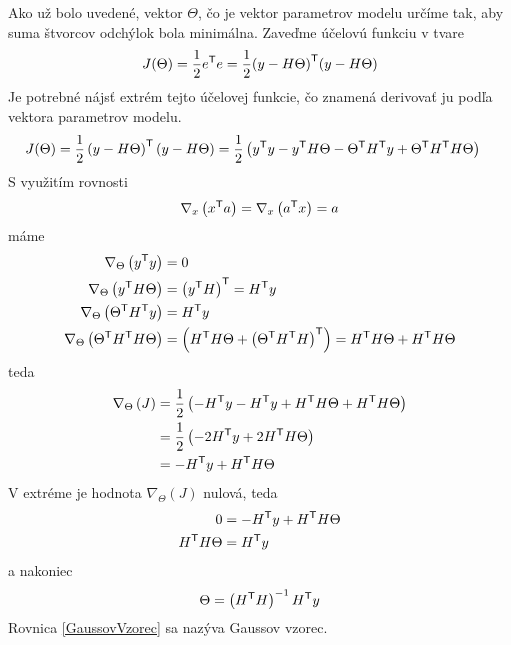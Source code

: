 \documentclass[a4paper, 10pt, ]{article}
\begin{document}
Ako už bolo uvedené, vektor $\Theta$, čo je vektor parametrov modelu určíme tak, aby suma štvorcov odchýlok bola minimálna. Zaveďme účelovú funkciu v tvare
\begin{equation} \label{ucFcnBez}
	J(\Theta) = \frac{1}{2}  e^{\mathsf{T}} e =  \frac{1}{2} {\left({ y -  H \Theta}\right)}^{\mathsf{T}} {\left({ y -  H \Theta}\right)}
\end{equation}
Je potrebné nájsť extrém tejto účelovej funkcie, čo znamená derivovať ju podľa vektora parametrov modelu.
\begin{equation}
	\begin{split}
	J(\Theta) &= \frac{1}{2} \left( y -  H \Theta \right)^{\mathsf{T}}   \left( y - H \Theta \right) = \frac{1}{2} \left( y^{\mathsf{T}} y - y^{\mathsf{T}} H \Theta - \Theta^{\mathsf{T}} H^{\mathsf{T}} y + \Theta^{\mathsf{T}} H^{\mathsf{T}} H \Theta \right)
\end{split}
\end{equation}
S využitím rovnosti
\begin{equation}
	\nabla_{x} \left( x^{\mathsf{T}} a \right) = \nabla_{x} \left( a^{\mathsf{T}} x \right) = a
\end{equation}
máme
\begin{align*}
	\nabla_\Theta \left( y^{\mathsf{T}} y \right) &= 0 \\
	\nabla_\Theta \left( y^{\mathsf{T}} H \Theta \right) &= \left( y^{\mathsf{T}} H \right)^{\mathsf{T}} = H^{\mathsf{T}} y \\
	\nabla_\Theta \left( \Theta^{\mathsf{T}} H^{\mathsf{T}} y \right) &= H^{\mathsf{T}} y \\
	\nabla_\Theta \left( \Theta^{\mathsf{T}} H^{\mathsf{T}} H \Theta \right) &= \left( H^{\mathsf{T}} H \Theta + \left( \Theta^{\mathsf{T}} H^{\mathsf{T}} H \right)^{\mathsf{T}} \right) = H^{\mathsf{T}} H \Theta + H^{\mathsf{T}} H \Theta
\end{align*}
teda
\begin{equation}
	\begin{split}
		\nabla_{\Theta} \left( J \right) &= \frac{1}{2} \left( - H^{\mathsf{T}} y - H^{\mathsf{T}} y + H^{\mathsf{T}} H \Theta + H^{\mathsf{T}} H \Theta \right)
		\\ & = \frac{1}{2} \left( - 2 H^{\mathsf{T}} y + 2 H^{\mathsf{T}} H \Theta \right)
		\\ & = - H^{\mathsf{T}} y + H^{\mathsf{T}}  H \Theta
	\end{split}
\end{equation}
V extréme je hodnota $\nabla_{\Theta} \left( J \right)$ nulová, teda
\begin{equation}
	\begin{split}
		0 &= - H^{\mathsf{T}} y + H^{\mathsf{T}} H \Theta \\
		H^{\mathsf{T}} H \Theta &= H^{\mathsf{T}} y
	\end{split}
\end{equation}
a nakoniec
\begin{equation} \label{GaussovVzorec}
	\Theta = \left( H^{\mathsf{T}} H \right)^{-1} H^{\mathsf{T}} y
\end{equation}
Rovnica \eqref{GaussovVzorec} sa nazýva Gaussov vzorec.
\end{document}

